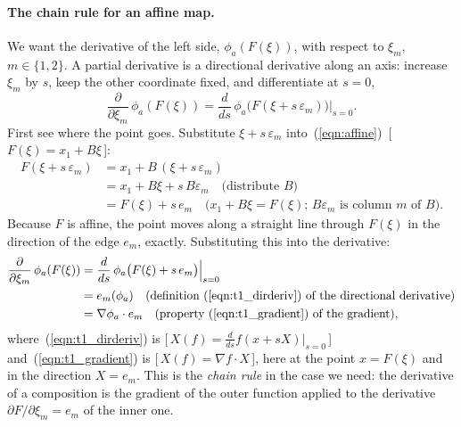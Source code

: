 \paragraph{The chain rule for an affine map.} We want the derivative of the left side, $\phi_a(F(\xi))$, with respect to $\xi_m$, $m \in \{1, 2\}$. A partial derivative is a directional derivative along an axis: increase $\xi_m$ by $s$, keep the other coordinate fixed, and differentiate at $s = 0$,
\begin{equation*}
\frac{\partial}{\partial\xi_m}\, \phi_a(F(\xi)) = \frac{d}{ds}\, \phi_a\big(F(\xi + s\,\varepsilon_m)\big)\Big|_{s=0} .
\end{equation*}
First see where the point goes. Substitute $\xi + s\,\varepsilon_m$ into~(\ref{eqn:affine})~[\,$F(\xi) = x_1 + B\xi$\,]:
\begin{align*}
F(\xi + s\, \varepsilon_m) &= x_1 + B\,(\xi + s\,\varepsilon_m) \\
&= x_1 + B\xi + s\, B\varepsilon_m \quad \text{(distribute $B$)}\\
&= F(\xi) + s\, e_m \quad \text{($x_1 + B\xi = F(\xi)$; $B\varepsilon_m$ is column $m$ of $B$)} .
\end{align*}
Because $F$ is affine, the point moves along a straight line through $F(\xi)$ in the direction of the edge $e_m$, exactly. Substituting this into the derivative:
\begin{align*}
\frac{\partial}{\partial\xi_m}\, \phi_a(F(\xi)) &= \frac{d}{ds}\, \phi_a\big(F(\xi) + s\, e_m\big)\Big|_{s=0} \\
&= e_m(\phi_a) \quad \text{(definition~(\ref{eqn:t1_dirderiv}) of the directional derivative)}\\
&= \nabla\phi_a \cdot e_m \quad \text{(property~(\ref{eqn:t1_gradient}) of the gradient)} ,
\end{align*}
where~(\ref{eqn:t1_dirderiv}) is [\,$X(f) = \frac{d}{ds}f(x + sX)|_{s=0}$\,] and~(\ref{eqn:t1_gradient}) is [\,$X(f) = \nabla f\cdot X$\,], here at the point $x = F(\xi)$ and in the direction $X = e_m$. This is the \emph{chain rule} in the case we need: the derivative of a composition is the gradient of the outer function applied to the derivative $\partial F/\partial\xi_m = e_m$ of the inner one.

